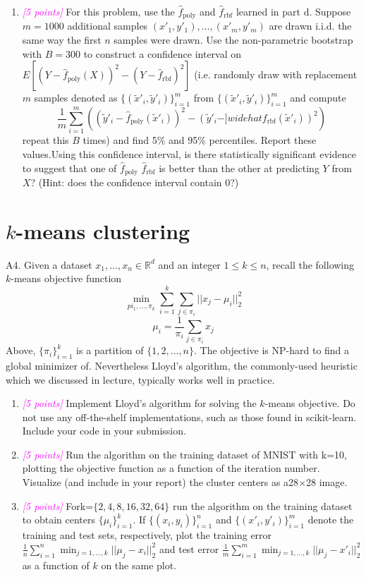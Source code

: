 \documentclass{article}
\newcommand{\field}[1]{\mathbb{#1}}
\newcommand{\1}{\mathbf{1}}
\newcommand{\R}{\field{R}} %
\newcommand{\points}[1]{\small\textcolor{magenta}{\emph{[#1 points]}} \normalsize}
\begin{document}
\begin{enumerate}
    \item \points{5}For this problem, use the $\widehat f_{\text{poly}}$ and $\widehat f_{\text{rbf}}$ learned in part d. Suppose $m=1000$ additional samples $(x'_1,y'_1),\hdots ,(x'_m,y'_m)$ are drawn i.i.d. the same way the first $n$ samples were drawn. Use the non-parametric bootstrap with $B=300$ to construct a confidence interval on $E[(Y - \widehat f_{\text{poly}} (X))^2 - (Y - \widehat f_{\text{rbf}})^2]$ (i.e. randomly draw with replacement $m$ samples denoted as $\{(\tilde x'_i, \tilde y'_i)\}^m_{i=1}$ from $\{(\tilde x'_i, \tilde y'_i)\}^m_{i=1}$ and compute 
    $$\frac{1}{m}\sum^m_{i=1} ((\tilde  y'_i - \widehat f_{\text{poly}} (\tilde x'_i))^2 - (\tilde y'_i - ]widehat f_{\text{rbf}} (\tilde x'_i))^2)$$
    repeat this $B$ times) and find 5\% and 95\% percentiles. Report these values.Using this confidence interval, is there statistically significant evidence to suggest that one of $\widehat f_{\text{poly}}$ $\widehat f_{\text{rbf}}$ is better than the other at predicting $Y$ from $X$? (Hint:  does the confidence interval contain 0?)
\end{enumerate}


\newpage
\section*{$k$-means clustering}
A4. Given a dataset $x_1,\hdots, x_n \in\R^d$ and an integer $1\leq k \leq n$, recall the following $k$-means objective function 
$$\min_{pi_1,\hdots,\pi_k} \sum_{i=1}^k\sum_{j\in\pi_i} ||x_j-\mu_i||^2_2$$
$$\mu_i=\frac{1}{\pi_i} \sum_{j\in\pi_i} x_j$$
Above, $\{\pi_i\}^k_{i=1}$ is a partition of $\{1,2,\hdots,n\}$. The objective is NP-hard to find a global minimizer of. Nevertheless Lloyd’s algorithm, the commonly-used heuristic which we discussed in lecture, typically works well in practice.
\begin{enumerate}
    \item \points{5} Implement Lloyd’s algorithm for solving the $k$-means objective. Do not use any off-the-shelf implementations, such as those found in scikit-learn.  Include your code in your submission.
    \item \points{5} Run the algorithm on the training dataset of MNIST with k=10, plotting the objective function as a function of the iteration number. Visualize (and include in your report) the cluster centers as a28$\times$28 image.
    \item \points{5} Fork=$\{2,4,8,16,32,64\}$ run the algorithm on the training dataset to obtain centers $\{\mu_i\}^k_{i=1}$. If $\{(x_i,y_i)\}^n_{i=1}$ and $\{(x'_i,y'_i)\}^m_{i=1}$ denote the training and test sets, respectively, plot the training error $\frac{1}{n}\sum^n_{i=1}\min_{j=1,\hdots,k} ||\mu_j - x_i ||^2_2$ and test error $\frac{1}{m}\sum^m_{i=1} \min_{j=1,\hdots,k} ||\mu_j - x'_i||^2_2$ as a function of $k$ on the same plot.
\end{enumerate}
\end{document}
